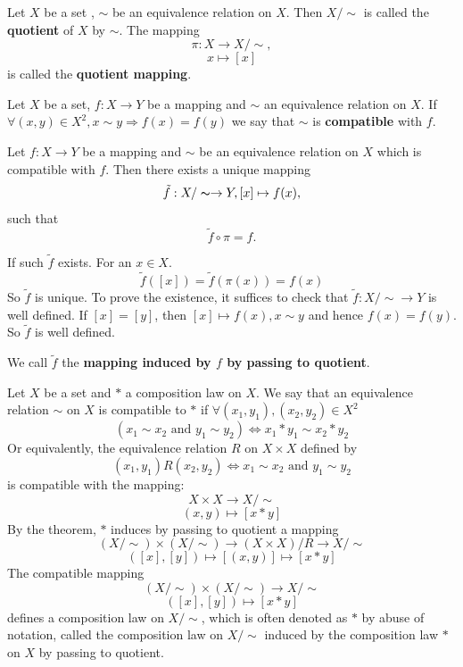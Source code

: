 \begin{notationenv}
    Let $X$ be a set ,  $\sim $ be an equivalence relation on $X$. Then $X/\sim$ is called the \textbf{quotient} of $X$ by $\sim$. The mapping 
    $$\pi:X\longrightarrow X/\sim , $$
    $$x\longmapsto [x]$$
is called the \textbf{quotient mapping}.
\end{notationenv}
\begin{definitionenv}
    Let $X$ be a set,  $f:X\rightarrow Y$ be a mapping and $\sim $ an equivalence relation on $X$. If $\forall(x, y)\in X^2,  x\sim y\Rightarrow f(x)=f(y)$ we say that $\sim$ is \textbf{compatible} with $f$.
\end{definitionenv}
\begin{theoremenv}\label{5.5.5}
    Let $f:X\rightarrow Y$ be a mapping and $\sim $ be an equivalence relation on $X$ which is compatible with $f$. Then there exists a unique mapping 
    $$\tilde{f}:X/\thicksim\rightarrow Y,  [x]\mapsto f(x), $$such that $$\tilde{f}\circ \pi =f.$$
    \begin{center}
\end{center}
\end{theoremenv}
\begin{proofenv}
    If such $\tilde{f}$ exists. For an $x\in X$. 
    $$\tilde{f}([x])=\tilde{f}(\pi(x))=f(x)$$
    So $\tilde{f}$ is unique. To prove the existence,  it suffices to check that $\tilde{f}:X/\sim\rightarrow Y$ is well defined. If $[x]=[y]$,  then $[x]\mapsto f(x),  x\sim y$ and hence $f(x)=f(y)$. So $\tilde{f}$ is well defined.
\end{proofenv}
\begin{definitionenv}
    We call $\tilde{f}$ the \textbf{mapping induced by $f$ by passing to quotient}.
\end{definitionenv}
\begin{exampleenv}
    Let $X$ be a set and $*$ a composition law on $X$. We say that an equivalence relation $\sim$ on $X$ is compatible to $*$ if $\forall (x_1, y_1), (x_2, y_2)\in X^2$
    $$(x_1\sim x_2 \text{ and } y_1\sim y_2)\Leftrightarrow x_1*y_1\sim x_2*y_2$$
    Or equivalently,  the equivalence relation $R$ on $X\times X$ defined by 
    $$(x_1, y_1)R(x_2, y_2)\Leftrightarrow x_1\sim x_2\text{ and }y_1\sim y_2$$
    is compatible with the mapping:
    $$X\times X\longrightarrow X/\sim$$
    $$(x, y)\longmapsto [x*y]$$
    By the theorem,  $*$ induces by passing to quotient a mapping
    $$(X/\sim)\times (X/\sim) \longrightarrow (X\times X)/R\longrightarrow X/\sim$$
    $$([x], [y])\longmapsto[(x, y)]\longmapsto[x*y]$$
    The compatible mapping
    $$(X/\sim)\times (X/\sim) \longrightarrow X/\sim$$
    $$([x], [y])\longmapsto[x*y]$$
    defines a composition law on $X/\sim$,  which is often denoted as $*$ by abuse of notation,  called the composition law on $X/\sim$ induced by the composition law $*$ on $X$ by passing to quotient.
\end{exampleenv}
